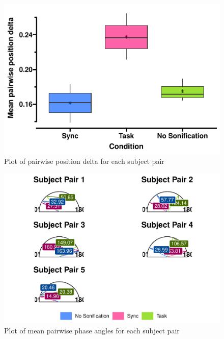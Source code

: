 \documentclass[10pt,a4paper,onecolumn]{article}
\begin{document}
\begin{figure}

{\centering \includegraphics[width=1\linewidth]{CogSci_Bachelor_Thesis_files/figure-latex/pairwise-position-delta-1} 

}

\caption{Plot of pairwise position delta for each subject pair}\label{fig:pairwise-position-delta}
\end{figure}

\begin{figure}

{\centering \includegraphics[width=1\linewidth]{CogSci_Bachelor_Thesis_files/figure-latex/instantaneous-phase-angle-circular-plot-1} 

}

\caption{Plot of mean pairwise phase angles for each subject pair}\label{fig:instantaneous-phase-angle-circular-plot}
\end{figure}
\end{document}
